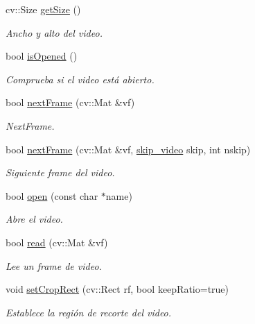 \begin{DoxyCompactItemize}
cv\+::\+Size \hyperlink{class_i3_d_1_1_video_stream_ac17f6f75aec2c161070d794715033023}{get\+Size} ()
\begin{DoxyCompactList}\small\item\em Ancho y alto del video. \end{DoxyCompactList}\item 
bool \hyperlink{class_i3_d_1_1_video_stream_a11947a15a95cf62d68b987d16887bd23}{is\+Opened} ()
\begin{DoxyCompactList}\small\item\em Comprueba si el video está abierto. \end{DoxyCompactList}\item 
bool \hyperlink{class_i3_d_1_1_video_stream_ad19ab11928372741ddb1ab0328d9aa8f}{next\+Frame} (cv\+::\+Mat \&vf)
\begin{DoxyCompactList}\small\item\em Next\+Frame. \end{DoxyCompactList}\item 
bool \hyperlink{class_i3_d_1_1_video_stream_a72e10a1973eecdf0b8b87fbefbb56473}{next\+Frame} (cv\+::\+Mat \&vf, \hyperlink{namespace_i3_d_abddd5dc8b13d45924d75d4dc1d6a0c9e}{skip\+\_\+video} skip, int nskip)
\begin{DoxyCompactList}\small\item\em Siguiente frame del video. \end{DoxyCompactList}\item 
bool \hyperlink{class_i3_d_1_1_video_stream_a9643964af546aca51505b3aed39a4d95}{open} (const char $\ast$name)
\begin{DoxyCompactList}\small\item\em Abre el video. \end{DoxyCompactList}\item 
bool \hyperlink{class_i3_d_1_1_video_stream_a6866f7dd07b694123645608da91c998c}{read} (cv\+::\+Mat \&vf)
\begin{DoxyCompactList}\small\item\em Lee un frame de video. \end{DoxyCompactList}\item 
void \hyperlink{class_i3_d_1_1_video_stream_ad3a32965a9dc2a7fd1b26996064ede92}{set\+Crop\+Rect} (cv\+::\+Rect rf, bool keep\+Ratio=true)
\begin{DoxyCompactList}\small\item\em Establece la región de recorte del video. \end{DoxyCompactList}\item 

\end{DoxyCompactItemize}

